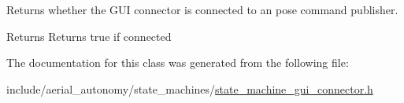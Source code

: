 Returns whether the G\-U\-I connector is connected to an pose command publisher. 

\begin{DoxyReturn}{Returns}
Returns true if connected 
\end{DoxyReturn}


The documentation for this class was generated from the following file\-:\begin{DoxyCompactItemize}
\item 
include/aerial\-\_\-autonomy/state\-\_\-machines/\hyperlink{state__machine__gui__connector_8h}{state\-\_\-machine\-\_\-gui\-\_\-connector.\-h}\end{DoxyCompactItemize}
